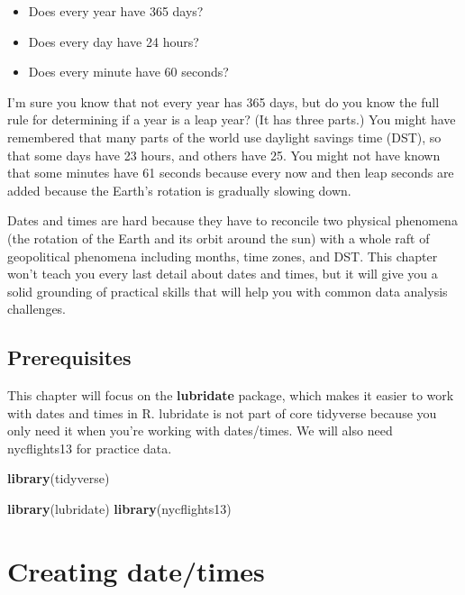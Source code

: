 \documentclass[]{book}
\newenvironment{Shaded}{\begin{snugshade}}{\end{snugshade}}
\newcommand{\KeywordTok}[1]{\textcolor[rgb]{0.13,0.29,0.53}{\textbf{{#1}}}}
\newcommand{\NormalTok}[1]{{#1}}
\providecommand{\tightlist}{%
  \setlength{\itemsep}{0pt}\setlength{\parskip}{0pt}}
\begin{document}
\begin{itemize}
\tightlist
\item
  Does every year have 365 days?
\item
  Does every day have 24 hours?
\item
  Does every minute have 60 seconds?
\end{itemize}

I'm sure you know that not every year has 365 days, but do you know the
full rule for determining if a year is a leap year? (It has three
parts.) You might have remembered that many parts of the world use
daylight savings time (DST), so that some days have 23 hours, and others
have 25. You might not have known that some minutes have 61 seconds
because every now and then leap seconds are added because the Earth's
rotation is gradually slowing down.

Dates and times are hard because they have to reconcile two physical
phenomena (the rotation of the Earth and its orbit around the sun) with
a whole raft of geopolitical phenomena including months, time zones, and
DST. This chapter won't teach you every last detail about dates and
times, but it will give you a solid grounding of practical skills that
will help you with common data analysis challenges.

\subsection{Prerequisites}\label{prerequisites-10}

This chapter will focus on the \textbf{lubridate} package, which makes
it easier to work with dates and times in R. lubridate is not part of
core tidyverse because you only need it when you're working with
dates/times. We will also need nycflights13 for practice data.

\begin{Shaded}
\begin{Highlighting}[]
\KeywordTok{library}\NormalTok{(tidyverse)}

\KeywordTok{library}\NormalTok{(lubridate)}
\KeywordTok{library}\NormalTok{(nycflights13)}
\end{Highlighting}
\end{Shaded}

\section{Creating date/times}\label{creating-datetimes}
\end{document}
